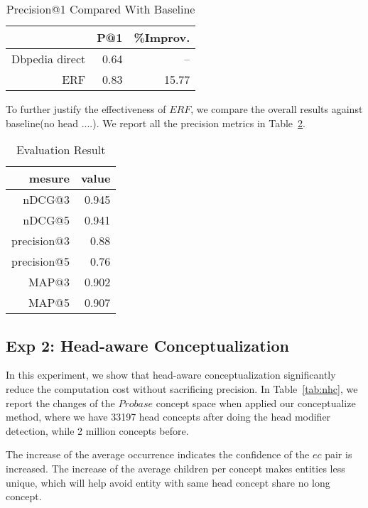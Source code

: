 \begin{table}[htbp]
  \centering
  \caption{Precision@1 Compared With Baseline}
    \begin{tabular}{rrr}
    \toprule
         & P@1  & \%Improv. \\
    \midrule
    Dbpedia direct & 0.64 & -- \\
    ERF  & 0.83 & 15.77 \\
    \bottomrule
    \end{tabular}%
  \label{tab:precision_compare}%
\end{table}%


To further justify the effectiveness of $ERF$, we compare the overall results against baseline(no head ....).
  We report all the precision metrics in Table~\ref{tab:ndcg}.

\begin{table}[htbp]
  \centering
  \caption{Evaluation Result}
    \begin{tabular}{rr}
    \toprule
    mesure & value \\
    \midrule
    nDCG@3 & 0.945 \\
    nDCG@5 & 0.941 \\
    precision@3 & 0.88 \\
    precision@5 & 0.76 \\
    MAP@3 & 0.902 \\
    MAP@5 & 0.907 \\

    \bottomrule
    \end{tabular}%
  \label{tab:ndcg}%
\end{table}%





\subsection{Exp 2: Head-aware Conceptualization}
In this experiment, we show that head-aware conceptualization significantly reduce the computation cost without sacrificing precision. 
In Table~\ref{tab:nhc}, we report the changes of the $Probase$ concept space when applied our conceptualize method, where we have 33197 head concepts after doing the head modifier detection, while 2 million concepts before.

The increase of the average occurrence indicates the confidence of the $e$\isa$c$ pair is increased.
The increase of the average children per concept makes entities less unique, which will help avoid entity with same head concept share no long concept.

